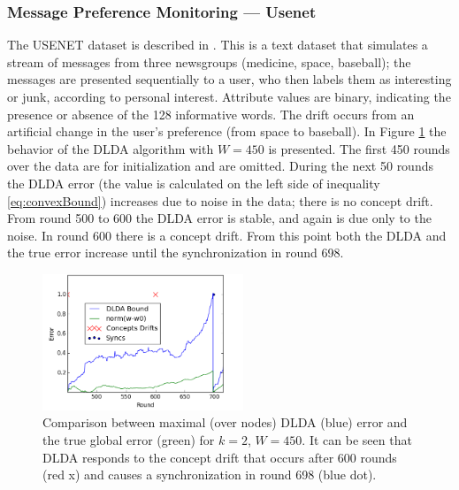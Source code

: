 \documentclass{sig-alternate-05-2015}
\begin{document}
\subsubsection{Message Preference Monitoring --- Usenet}
The USENET dataset is described in \cite{usenet}.
This is a text dataset that simulates a stream of messages from three newsgroups
(medicine, space, baseball); the messages are presented sequentially to a user,
who then labels them as interesting or junk, according to personal interest.
Attribute values are binary, indicating the presence or absence of the 128
informative words. The drift occurs from an artificial change in the user's
preference (from space to baseball). In Figure \ref{usenet} the behavior of the
DLDA algorithm with $W=450$ is presented. The first 450 rounds over the data are for
initialization and are omitted. During the next 50 rounds the DLDA error
(the value is calculated on the left side of inequality
\ref{eq:convexBound}) increases due to noise in the data; there is
no concept drift. From round 500 to 600 the DLDA error is stable,
and again is due only to the noise. In round 600 there is a concept
drift.
From this point both the DLDA and the true error increase until the
synchronization in round 698.

\begin{figure}[h]
	\centering
	\includegraphics[width=60mm]{Usenet/DriftDetected.png}
	\caption{Comparison between maximal (over nodes) DLDA (blue)
	error and the true global error (green) for $k=2$, $W=450$.
	It can be seen that DLDA responds to the concept drift that occurs
	after 600 rounds (red x) and causes a synchronization in round 698 (blue dot).}
	\label{usenet}
	\end{figure}
	
\end{document}
